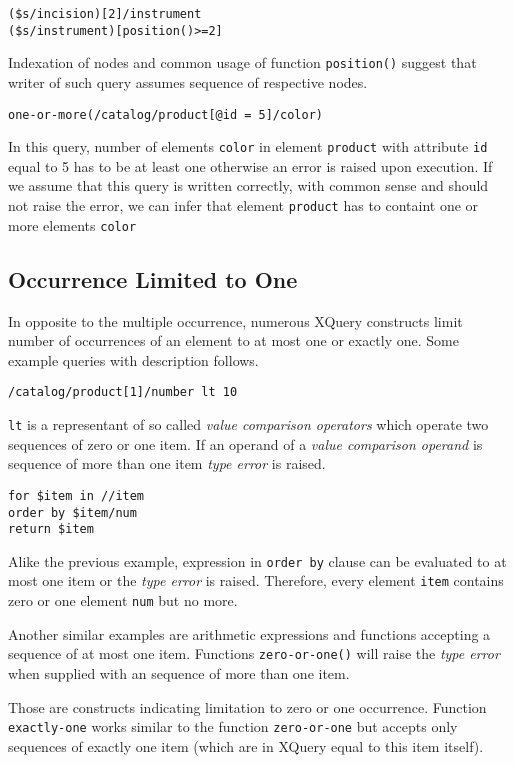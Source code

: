 \begin{verbatim}
($s/incision)[2]/instrument
($s/instrument)[position()>=2]
\end{verbatim}

Indexation of nodes and common usage of function \texttt{position()} suggest that writer of such query assumes sequence of respective nodes.

\begin{verbatim}
one-or-more(/catalog/product[@id = 5]/color)
\end{verbatim}

In this query, number of elements \texttt{color} in element \texttt{product} with attribute \texttt{id} equal to 5 has to be at least one otherwise an error is raised upon execution. If we assume that this query is written correctly, with common sense and should not raise the error, we can infer that element \texttt{product} has to containt one or more elements \texttt{color}

\subsection{Occurrence Limited to One}
In opposite to the multiple occurrence, numerous XQuery constructs limit number of occurrences of an element to at most one or exactly one. Some example queries with description follows.

\begin{verbatim}
/catalog/product[1]/number lt 10
\end{verbatim}

\texttt{lt} is a representant of so called \emph{value comparison operators} which operate two sequences of zero or one item. If an operand of a \emph{value comparison operand} is sequence of more than one item \emph{type error} is raised.

\begin{verbatim}
for $item in //item 
order by $item/num 
return $item
\end{verbatim}

Alike the previous example, expression in \texttt{order by} clause can be evaluated to at most one item or the \emph{type error} is raised. Therefore, every element \texttt{item} contains zero or one element \texttt{num} but no more.

Another similar examples are arithmetic expressions and functions accepting a sequence of at most one item. Functions \texttt{zero-or-one()} will raise the \emph{type error} when supplied with an sequence of more than one item.

Those are constructs indicating limitation to zero or one occurrence. Function \texttt{exactly-one} works similar to the function \texttt{zero-or-one} but accepts only sequences of exactly one item (which are in XQuery equal to this item itself).